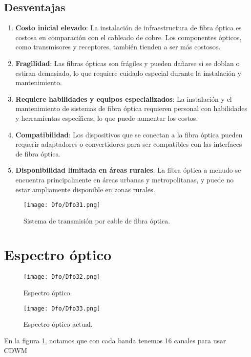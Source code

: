 \documentclass[
	12pt, %
	fleqn, %
	a4paper, %
	oneside, %
]{LegrandOrangeBook}
\begin{document}
\subsection{Desventajas}
\begin{enumerate}
\item \textbf{Costo inicial elevado}: La instalación de infraestructura de fibra óptica es costosa en comparación con el cableado de cobre. Los componentes ópticos, como transmisores y receptores, también tienden a ser más costosos.

\item \textbf{Fragilidad}: Las fibras ópticas son frágiles y pueden dañarse si se doblan o estiran demasiado, lo que requiere cuidado especial durante la instalación y mantenimiento.

\item \textbf{Requiere habilidades y equipos especializados}: La instalación y el mantenimiento de sistemas de fibra óptica requieren personal con habilidades y herramientas específicas, lo que puede aumentar los costos.

\item \textbf{Compatibilidad}: Los dispositivos que se conectan a la fibra óptica pueden requerir adaptadores o convertidores para ser compatibles con las interfaces de fibra óptica.

\item \textbf{Disponibilidad limitada en áreas rurales}: La fibra óptica a menudo se encuentra principalmente en áreas urbanas y metropolitanas, y puede no estar ampliamente disponible en zonas rurales.
\end{enumerate}

\begin{figure}[H]
\centering
\texttt{[image: Dfo/Dfo31.png]}
\caption{Sistema de transmisión por cable de fibra óptica.}
\end{figure}

\section{Espectro óptico}
\begin{figure}[H]
\centering
\texttt{[image: Dfo/Dfo32.png]}
\caption{Espectro óptico.}
\end{figure}
\begin{figure}[H]
\centering
\texttt{[image: Dfo/Dfo33.png]}
\caption{Espectro óptico actual.}
\label{fig:espectro optico actual}
\end{figure}
En la figura \ref{fig:espectro optico actual}, notamos que con cada banda tenemos 16 canales para usar CDWM
\end{document}
